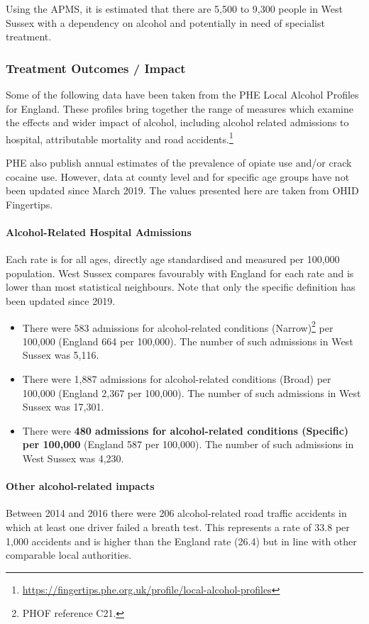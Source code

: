 Using the APMS, it is estimated that there are 5,500 to 9,300 people in West Sussex with a dependency on alcohol and potentially in need of specialist treatment.


\subsubsection{Treatment Outcomes / Impact}
Some of the following data have been taken from the PHE Local Alcohol Profiles for England. These profiles bring together the range of measures which examine the effects and wider impact of alcohol, including alcohol related admissions to hospital, attributable mortality and road accidents.\footnote{\url{https://fingertips.phe.org.uk/profile/local-alcohol-profiles}}

PHE also publish annual estimates of the prevalence of opiate use and/or crack cocaine use. However, data at county level and for specific age groups have not been updated since March 2019. The values presented here are taken from OHID Fingertips.

\paragraph{Alcohol-Related Hospital Admissions} Each rate is for all ages, directly age standardised and measured per 100,000 population. West Sussex compares favourably with England for each rate and is lower than most statistical neighbours. Note that only the specific definition has been updated since 2019.
\begin{itemize}[noitemsep]
    \item There were 583 admissions for alcohol-related conditions (Narrow)\footnote{PHOF reference C21.} per 100,000 (England 664 per 100,000). The number of such admissions in West Sussex was 5,116.
    \item There were 1,887 admissions for alcohol-related conditions (Broad) per 100,000 (England 2,367 per 100,000). The number of such admissions in West Sussex was 17,301.
    \item There were {\bfseries 480 admissions for alcohol-related conditions (Specific) per 100,000} (England 587 per 100,000). The number of such admissions in West Sussex was 4,230.
\end{itemize}
  
\paragraph{Other alcohol-related impacts}
Between 2014 and 2016 there were 206 alcohol-related road traffic accidents in which at least one driver failed a breath test. This represents a rate of 33.8 per 1,000 accidents and is higher than the England rate (26.4) but in line with other comparable local authorities.

